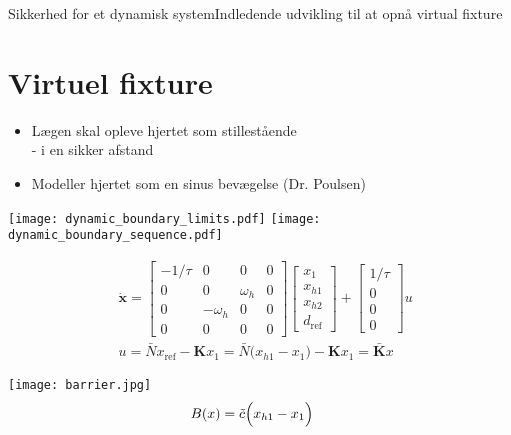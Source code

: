 \begin{frame}{Sikkerhed for et dynamisk system}{Indledende udvikling til at opnå virtual fixture}
\section{Virtuel fixture}
\vspace*{-0.2cm}
\begin{block}{}
	\begin{itemize}
		\item Lægen skal opleve hjertet som stillestående \\
		\scriptsize - i en sikker afstand
		\item \normalsize Modeller hjertet som en sinus bevægelse (Dr. Poulsen)
	\end{itemize}
\end{block}
\texttt{[image: dynamic\_boundary\_limits.pdf]} \hspace*{0.4cm}
\texttt{[image: dynamic\_boundary\_sequence.pdf]}

\begin{minipage}{0.7\textwidth}
\scriptsize
\begin{align*}
& \dot{\textbf{x}} = \begin{bmatrix}
-1/\tau & 0 & 0 & 0 \\
0 & 0 & \omega_h & 0 \\
0 & -\omega_h & 0 & 0 \\
0 & 0 & 0 & 0
\end{bmatrix} \begin{bmatrix}
x_1 \\ x_{h1} \\ x_{h2} \\ d_\text{ref}
\end{bmatrix} + \begin{bmatrix}
1/\tau \\ 0 \\ 0 \\ 0
\end{bmatrix} u \\
&  u = \bar{N} x_\text{ref} - \textbf{K} x_1 = \bar{N}\Big( x_{h1} - x_1 \Big) - \textbf{K} x_1 = \bar{\textbf{K}}x
\end{align*}
\end{minipage}
\hspace*{0.1cm}
\begin{minipage}{0.25\textwidth}
\vspace*{0.2cm}
\texttt{[image: barrier.jpg]}
\hspace*{-0.3cm}
\vspace*{-0.2cm} \scriptsize
\begin{align*}
B(x) = \tilde{c}\Big( x_{h1} - x_1 \Big){\color{white}{lol}}
\end{align*}
\end{minipage}
\end{frame}

